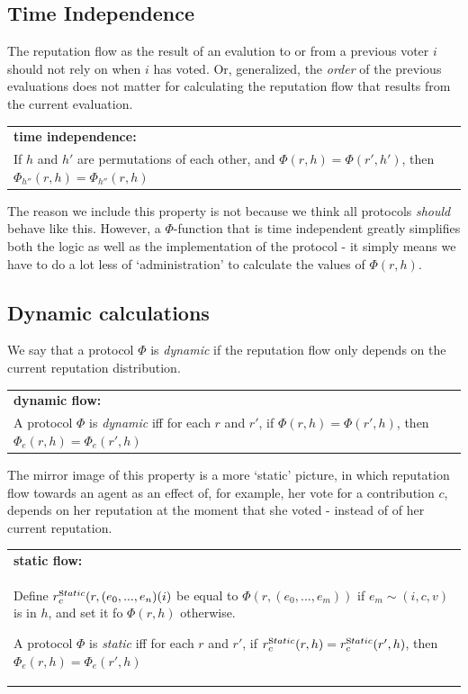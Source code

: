 \documentclass{article}
\newcommand{\flow}{\Phi}
\newenvironment{condition}[1]
	{
	\begin{center}
	   \begin{tabular}{|p{.9\textwidth}|}
		\hline \medskip
		{\bf #1:}\\
	}
	{
		\medskip \\\hline
	\end{tabular}
	\end{center}
	}
\begin{document}
\subsection{Time Independence}

The reputation flow as the result of an evalution to or from a previous voter $i$ should not rely on when $i$ has voted. Or, generalized, the {\em order} of the previous evaluations does not matter for calculating the reputation flow that results from the current evaluation. 
\begin{condition}{time independence}
If $h$ and $h'$ are permutations of each other, and $\flow(r, h) = \flow(r', h')$, then $\flow_{h''}(r, h) = \flow_{h''}(r, h)$
\label{condition: time independence}
\end{condition}
The reason we include this property is not because we think all protocols {\em should} behave like this. However, a $\flow$-function that is time independent greatly simplifies both the logic as well as the implementation of the protocol - it simply means we have to do a lot less of `administration' to calculate the values of $\Phi(r, h)$.

\subsection{Dynamic calculations}

We say that a protocol $\flow$ is {\em dynamic} if the reputation flow only depends on the current reputation distribution.
\begin{condition}{dynamic flow}
A protocol $\flow$ is {\em dynamic} iff for each $r$ and $r'$, if $\Phi(r, h) = \Phi(r', h)$, then $\Phi_{e}(r, h) = \Phi_{e}(r', h)$
\end{condition}
The mirror image of this property is a more `static' picture, in which reputation flow towards an agent as an effect of, for example, her vote for a contribution $c$, depends on her reputation at the moment that she voted - instead of of her current reputation. 

\begin{condition}{static flow}

Define $r^{\mbox static}_{c}(r, (e_0, ... , e_n)(i)$ be equal to $\flow(r, (e_0, ..., e_m))$ if $e_m \sim (i, c, v)$ is in $h$, and set it fo $\flow(r, h)$ otherwise. 

A protocol $\flow$ is {\em static} iff for each $r$ and $r'$, if $r^{\mbox static}_{c}(r, h) = r^{\mbox static}_{c}(r', h)$, then $\Phi_{e}(r, h) = \Phi_{e}(r', h)$
\end{condition}
\end{document}
